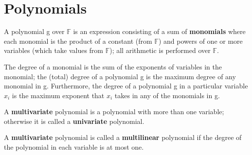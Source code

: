 \section{Polynomials}

\begin{definition}
A polynomial g over $\mathbb{F}$ is an expression consisting of a sum of \textbf{monomials} where each monomial is the product of a constant (from $\mathbb{F}$) and powers of one or more variables (which take values from $\mathbb{F}$); all arithmetic is performed over $\mathbb{F}$.
\end{definition}

\begin{definition}
The degree of a monomial is the sum of the exponents of variables in the monomial; the (total) degree of a polynomial g is the maximum degree of any monomial in g. Furthermore, the degree of a polynomial g in a particular variable $x_i$ is the maximum exponent that $x_i$ takes in any of the monomials in g.
\end{definition}

\begin{definition}
A \textbf{multivariate} polynomial is a polynomial with more than one variable; otherwise it is called a \textbf{univariate} polynomial.
\end{definition}

\begin{definition}
A \textbf{multivariate} polynomial is called a \textbf{multilinear} polynomial if the degree of the polynomial in each variable is at most one.
\end{definition}

